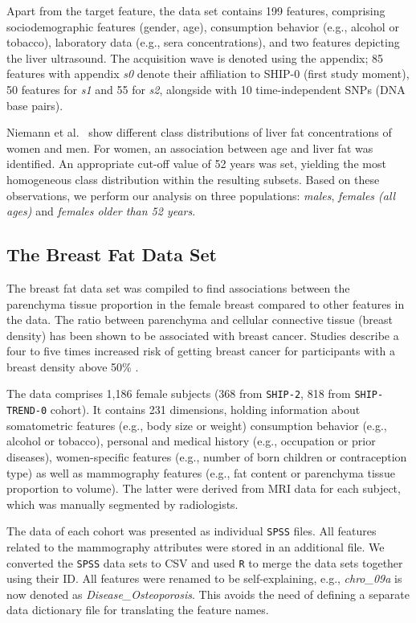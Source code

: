 \documentclass[journal]{style/vgtc} 			          %
\begin{document}
Apart from the target feature, the data set contains 199 features, comprising sociodemographic features (gender, age), consumption behavior (e.g., alcohol or tobacco), laboratory data (e.g., sera concentrations), and two features depicting the liver ultrasound.
The acquisition wave is denoted using the appendix; 85 features with appendix \emph{s0} denote their affiliation to SHIP-0 (first study moment), 50 features for \emph{s1} and 55 for \emph{s2}, alongside with 10 time-independent SNPs (DNA base pairs).

Niemann et al.~\cite{Niemann2014} show different class distributions of liver fat concentrations of women and men.
For women, an association between age and liver fat was identified.
An appropriate cut-off value of 52 years was set, yielding the most homogeneous class distribution within the resulting subsets.
Based on these observations, we perform our analysis on three populations: \emph{males}, \emph{females (all ages)} and \emph{females older than 52 years}.
\subsection{The Breast Fat Data Set}
The breast fat data set was compiled to find associations between the parenchyma tissue proportion in the female breast compared to other features in the data.
The ratio between parenchyma and cellular connective tissue (breast density) has been shown to be associated with breast cancer.
Studies describe a four to five times increased risk of getting breast cancer for participants with a breast density above 50\% \cite{Mccormack2006}.

The data comprises 1,186 female subjects (368 from \texttt{SHIP-2}, 818 from \texttt{SHIP-TREND-0} cohort).
It contains 231 dimensions, holding information about somatometric features (e.g., body size or weight) consumption behavior (e.g., alcohol or tobacco), personal and medical history (e.g., occupation or prior diseases), women-specific features (e.g., number of born children or contraception type) as well as mammography features (e.g., fat content or parenchyma tissue proportion to volume).
The latter were derived from MRI data for each subject, which was manually segmented by radiologists.

The data of each cohort was presented as individual \texttt{SPSS} files.
All features related to the mammography attributes were stored in an additional file.
We converted the \texttt{SPSS} data sets to CSV and used \texttt{R} to merge the data sets together using their ID.
All features were renamed to be self-explaining, e.g., \emph{chro\_09a} is now denoted as \emph{Disease\_Osteoporosis}.
This avoids the need of defining a separate data dictionary file for translating the feature names.
\end{document}
